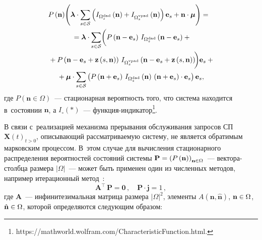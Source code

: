 \begin{multicols}{2}
\noindent
\begin{multline*}
\!\!\!\! P\left(\mathbf{n}\right)\! \left( \boldsymbol\lambda \cdot 
\sum_{s\in\mathcal{S}}{\left( I_{\Omega_s^{\mathrm{dad}}}\left(\mathbf{n}\right) + 
I_{\Omega_s^{\mathrm{vpad}}}\left(\mathbf{n}\right) \right) \mathbf{e}_s + 
\mathbf{n}\cdot\boldsymbol\mu} \right) = {}\hspace*{-2.69116pt}\\
{}= \boldsymbol\lambda \cdot \sum_{s\in\mathcal{S}}
\biggl(
P\left(\mathbf{n}-\mathbf{e}_s\right)\, 
I_{\Omega_s^{\mathrm{dad}}}\left(\mathbf{n}-\mathbf{e}_s\right) + {}\hspace*{-2.69116pt}\\
{}+ P\left(\mathbf{n}-\mathbf{e}_s+\mathbf{z}\left(s,\mathbf{n}\right)\right)\, 
I_{\Omega_s^{\mathrm{vpad}}}\left(\mathbf{n}-
\mathbf{e}_s+\mathbf{z}\left(s,\mathbf{n}\right)\right)\!\!
\biggl)
\mathbf{e}_s +{}\hspace*{-2.69116pt}\\
{}+ \boldsymbol\mu \cdot 
\sum_{s\in\mathcal{S}}{\left(P\left(\mathbf{n}+\mathbf{e}_s\right)\, 
I_{\Omega_s^{\mathrm{dad}}}\left(\mathbf{n}\right)\, 
\left(\mathbf{n}+\mathbf{e}_s\right)\cdot\mathbf{e}_s\right)\mathbf{e}_s},
\end{multline*}
где $P\left(\mathbf{n}\in\Omega\right)$~--- стационарная вероятность того, что 
система находится в~состоянии $\mathbf{n}$, а $I_{\circ}\left(\ast\right)$~--- 
функ\-ция-ин\-ди\-ка\-тор\footnote{{\sf https://mathworld.wolfram.com/CharacteristicFunction.html.}}.

В связи с~реализацией механизма прерывания обслуживания запросов СП 
$\mathbf{X}\left(t\right)_{t>0}$, опи\-сы\-ва\-ющий рас\-смат\-ри\-ва\-емую сис\-те\-му, не 
является обратимым марковским процессом. В~этом случае для вы\-чис\-ле\-ния 
стационарного распределения вероятностей со\-сто\-яний сис\-те\-мы 
$\mathbf{P}\hm=\left(P\left(\mathbf{n}\right)\right)_{\mathbf{n}\hm\in\Omega}$~--- 
век\-то\-ра-столб\-ца размера $\lvert\Omega\rvert$~--- может быть применен один из 
численных методов, например итерационный метод~\cite{Zhou2022,Stepanov}:
\begin{equation*}
\mathbf{A}^\top\, \mathbf{P} = \mathbf{0}\,,\quad \mathbf{P}\cdot \mathbf{j} = 1\,,
\end{equation*}
где $\mathbf{A}$~--- инфинитезимальная матрица размера $\lvert\Omega\rvert^2$, 
элементы $A\left(\mathbf{n},\hat{\mathbf{n}}\right)$, $\mathbf{n}\hm\in\Omega$, 
$\hat{\mathbf{n}}\hm\in\Omega$, которой определяются следующим образом:


\end{multicols}
